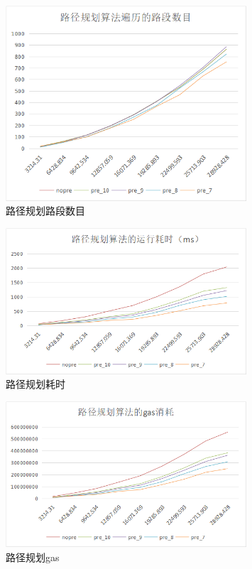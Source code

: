 \begin{figure}[h]
  \centering
  \includegraphics[height=0.3\textheight,width=0.8\textwidth]{figures/路径规划路段数目}
  \caption{路径规划路段数目}\label{fig:navRoads}
\end{figure}

\begin{figure}[h]
  \centering
  \includegraphics[height=0.3\textheight,width=0.8\textwidth]{figures/路径规划耗时}
  \caption{路径规划耗时}\label{fig:navTime}
\end{figure}

\begin{figure}[h]
  \centering
  \includegraphics[height=0.3\textheight,width=0.8\textwidth]{figures/路径规划gas}
  \caption{路径规划gas}\label{fig:navGas}
\end{figure}

